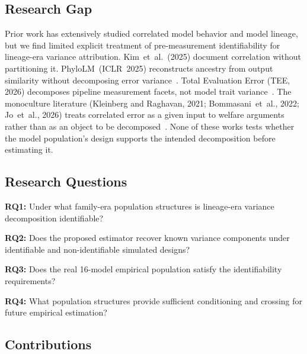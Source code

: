 \documentclass[journal]{IEEEtran}
\begin{document}
\subsection{Research Gap}

Prior work has extensively studied correlated model behavior and model lineage, but we find limited explicit treatment of pre-measurement identifiability for lineage-era variance attribution. Kim~et~al.~(2025) document correlation without partitioning it. PhyloLM~(ICLR~2025) reconstructs ancestry from output similarity without decomposing error variance~\cite{yax2025}. Total Evaluation Error (TEE, 2026) decomposes pipeline measurement facets, not model trait variance~\cite{messing2026}. The monoculture literature (Kleinberg and Raghavan, 2021; Bommasani~et~al., 2022; Jo~et~al., 2026) treats correlated error as a given input to welfare arguments rather than as an object to be decomposed~\cite{kleinberg2021,bommasani2022,jo2026}. None of these works tests whether the model population's design supports the intended decomposition before estimating it.

\subsection{Research Questions}

\textbf{RQ1:} Under what family-era population structures is lineage-era variance decomposition identifiable?

\textbf{RQ2:} Does the proposed estimator recover known variance components under identifiable and non-identifiable simulated designs?

\textbf{RQ3:} Does the real 16-model empirical population satisfy the identifiability requirements?

\textbf{RQ4:} What population structures provide sufficient conditioning and crossing for future empirical estimation?

\subsection{Contributions}
\end{document}
